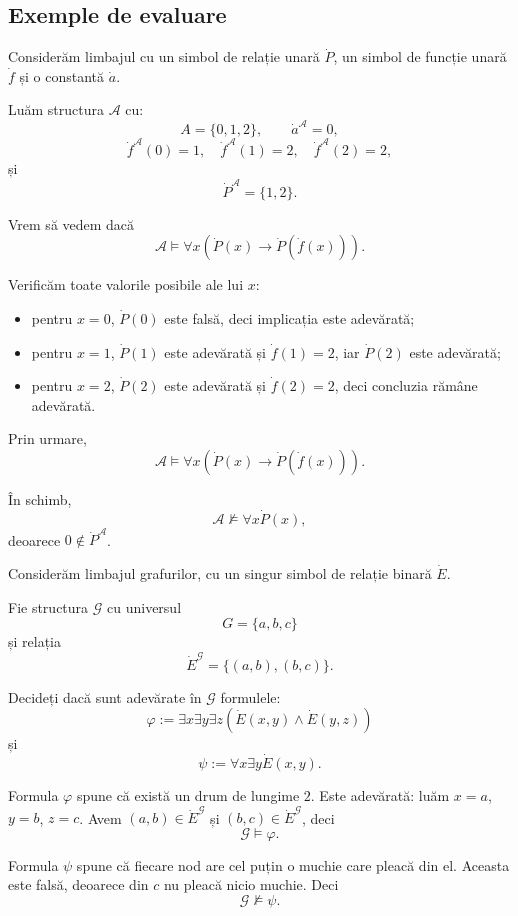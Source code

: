 \subsection{Exemple de evaluare}

\begin{eg}
	Considerăm limbajul cu un simbol de relație unară \( \dot{P} \), un simbol de funcție unară \( \dot{f} \) și o constantă \( \dot{a} \).

	Luăm structura \( \mathcal{A} \) cu:
	\[
		A = \{0,1,2\}, \qquad
		\dot{a}^{\mathcal{A}} = 0,
	\]
	\[
		\dot{f}^{\mathcal{A}}(0)=1, \quad
		\dot{f}^{\mathcal{A}}(1)=2, \quad
		\dot{f}^{\mathcal{A}}(2)=2,
	\]
	și
	\[
		\dot{P}^{\mathcal{A}} = \{1,2\}.
	\]

	Vrem să vedem dacă
	\[
		\mathcal{A} \models \forall x(\dot{P}(x) \to \dot{P}(\dot{f}(x))).
	\]

	Verificăm toate valorile posibile ale lui \(x\):
	\begin{itemize}
		\item pentru \(x=0\), \( \dot{P}(0) \) este falsă, deci implicația este adevărată;
		\item pentru \(x=1\), \( \dot{P}(1) \) este adevărată și \( \dot{f}(1)=2 \), iar \( \dot{P}(2) \) este adevărată;
		\item pentru \(x=2\), \( \dot{P}(2) \) este adevărată și \( \dot{f}(2)=2 \), deci concluzia rămâne adevărată.
	\end{itemize}

	Prin urmare,
	\[
		\mathcal{A} \models \forall x(\dot{P}(x) \to \dot{P}(\dot{f}(x))).
	\]

	În schimb,
	\[
		\mathcal{A} \not\models \forall x\dot{P}(x),
	\]
	deoarece \(0 \notin \dot{P}^{\mathcal{A}}\).
\end{eg}

\begin{ex}
	Considerăm limbajul grafurilor, cu un singur simbol de relație binară \( \dot{E} \).

	Fie structura \( \mathcal{G} \) cu universul
	\[
		G = \{a,b,c\}
	\]
	și relația
	\[
		\dot{E}^{\mathcal{G}} = \{(a,b), (b,c)\}.
	\]

	Decideți dacă sunt adevărate în \( \mathcal{G} \) formulele:
	\[
		\varphi := \exists x \exists y \exists z(\dot{E}(x,y) \land \dot{E}(y,z))
	\]
	și
	\[
		\psi := \forall x \exists y \dot{E}(x,y).
	\]
\end{ex}

\begin{solutie}
	Formula \( \varphi \) spune că există un drum de lungime \(2\). Este adevărată: luăm \(x=a\), \(y=b\), \(z=c\). Avem \((a,b) \in \dot{E}^{\mathcal{G}}\)
	și \((b,c) \in \dot{E}^{\mathcal{G}}\), deci
	\[
		\mathcal{G} \models \varphi.
	\]

	Formula \( \psi \) spune că fiecare nod are cel puțin o muchie care pleacă din el. Aceasta este falsă, deoarece din \(c\) nu pleacă nicio muchie. Deci
	\[
		\mathcal{G} \not\models \psi.
	\]
\end{solutie}

